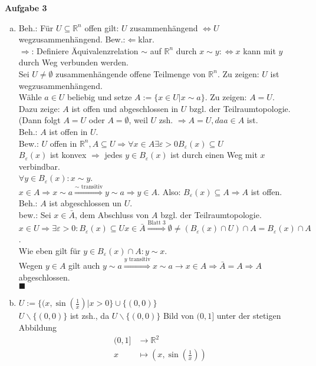 \documentclass{article}
\begin{document}
\textbf{Aufgabe 3}\\
\begin{enumerate}[(a)]
\item Beh.: Für $U\subseteq\mathbb{R}^n$ offen gilt: $U$ zusammenhängend $\Leftrightarrow U$ wegzusammenhängend.
Bew.:\glqq$\Leftarrow$\grqq klar.\\
\glqq$\Rightarrow$\grqq: Definiere Äquivalenzrelation $\sim$ auf $\mathbb{R}^n$ durch $x\sim y:\Leftrightarrow x$ kann mit $y$ durch Weg verbunden werden.\\
Sei $U\neq\emptyset$ zusammenhängende offene Teilmenge von $\mathbb{R}^n$. Zu zeigen: $U$ ist wegzusammenhängend.\\
Wähle $a\in U$ beliebig und setze $A:=\{x\in U|x\sim a\}$. Zu zeigen: $A=U$.\\
Dazu zeige: $A$ ist offen und abgeschlossen in $U$ bzgl. der Teilraumtopologie. (Dann folgt $A=U$ oder $A=\emptyset$, weil $U$ zsh. $\Rightarrow A=U, da a\in A$ ist.\\
Beh.: $A$ ist offen in $U$.\\
Bew.: $U$ offen in $\mathbb{R}^n, A\subseteq U\Rightarrow\forall x\in A\exists\varepsilon>0 B_\varepsilon(x)\subseteq U$\\
$B_\varepsilon(x)$ ist konvex $\Rightarrow$ jedes $y\in B_\varepsilon(x)$ ist durch einen Weg mit $x$ verbindbar.\\
$\forall y\in B_\varepsilon(x):x\sim y$.\\
$x\in A\Rightarrow x\sim a\stackrel{\sim\text{ transitiv}}{\Rightarrow}y\sim a\Rightarrow y\in A$. Also: $B_\varepsilon(x)\subseteq A\Rightarrow A$ ist offen.\\
Beh.: $A$ ist abgeschlossen un $U$.\\
bew.: Sei $x\in\bar A$, dem Abschluss von $A$ bzgl. der Teilraumtopologie.\\
$x\in U\Rightarrow\exists\varepsilon>0:B_\varepsilon(x)\subseteq U x\in\bar A\stackrel{\text{Blatt 3}}{\Rightarrow}\emptyset\neq(B_\varepsilon(x)\cap U)\cap A = B_\varepsilon(x)\cap A$.\\
Wie eben gilt für $y\in B_\varepsilon(x)\cap A:y\sim x$.\\
Wegen $y\in A$ gilt auch $y\sim a\stackrel{y\text{ transitiv}}{\Rightarrow}x\sim a\rightarrow x\in A\Rightarrow\bar A=A\Rightarrow A$ abgeschlossen.\\
$\blacksquare$
\item $U:=\{(x,\sin\left(\frac{1}{x}\right)|x>0\}\cup\{(0,0)\}$\\
$U\backslash\{(0,0)\}$ ist zsh., da $U\backslash\{(0,0)\}$ Bild von $(0,1]$ unter der stetigen Abbildung
\begin{align*}
(0,1]&\rightarrow\mathbb{R}^2\\
x&\mapsto(x,\sin\left(\frac1x\right))
\end{align*}


\end{enumerate}
\end{document}
